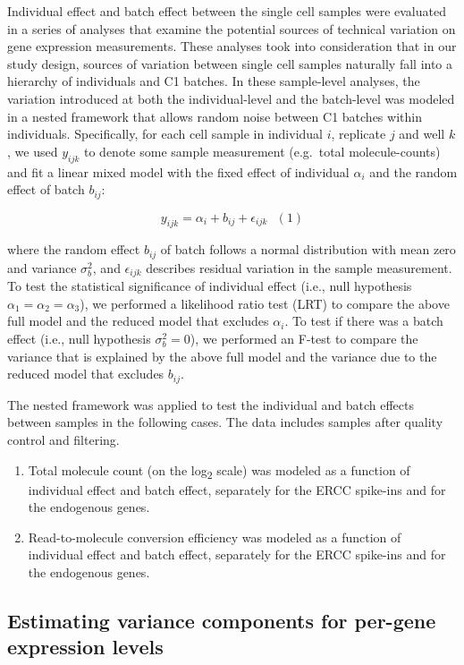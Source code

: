 Individual effect and batch effect between the single cell samples were
evaluated in a series of analyses that examine the potential sources of
technical variation on gene expression measurements. These analyses took
into consideration that in our study design, sources of variation
between single cell samples naturally fall into a hierarchy of
individuals and C1 batches. In these sample-level analyses, the
variation introduced at both the individual-level and the batch-level
was modeled in a nested framework that allows random noise between C1
batches within individuals. Specifically, for each cell sample in
individual $i$, replicate $j$ and well $k$, we used $y_{ijk}$ to denote
some sample measurement (e.g.~total molecule-counts) and fit a linear
mixed model with the fixed effect of individual $\alpha_i$ and the
random effect of batch $b_{ij}$:

\[y_{ijk} = \alpha_{i} + b_{ij} + \epsilon_{ijk} \,\,\,\,(1)\]

where the random effect $b_{ij}$ of batch follows a normal distribution
with mean zero and variance $\sigma^2_{b}$, and $\epsilon_{ijk}$
describes residual variation in the sample measurement. To test the
statistical significance of individual effect (i.e., null hypothesis
$\alpha_1 = \alpha_2 = \alpha_3$), we performed a likelihood ratio test
(LRT) to compare the above full model and the reduced model that
excludes $\alpha_i$. To test if there was a batch effect (i.e., null
hypothesis $\sigma^2_b = 0$), we performed an F-test to compare the
variance that is explained by the above full model and the variance due
to the reduced model that excludes $b_{ij}$.

The nested framework was applied to test the individual and batch
effects between samples in the following cases. The data includes
samples after quality control and filtering.

\begin{enumerate}
\def\labelenumi{\arabic{enumi}.}
\item
  Total molecule count (on the log\textsubscript{2} scale) was modeled
  as a function of individual effect and batch effect, separately for
  the ERCC spike-ins and for the endogenous genes.
\item
  Read-to-molecule conversion efficiency was modeled as a function of
  individual effect and batch effect, separately for the ERCC spike-ins
  and for the endogenous genes.
\end{enumerate}

\subsection{Estimating variance components for per-gene expression
levels}\label{estimating-variance-components-for-per-gene-expression-levels}

